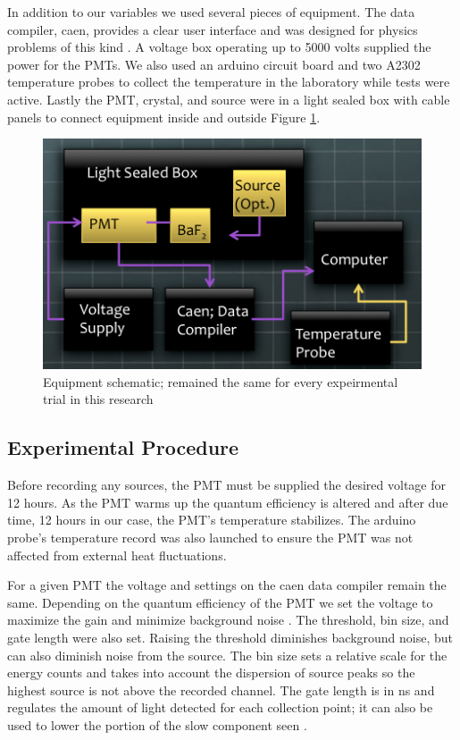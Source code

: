 \documentclass[aip, jmp, amsmath, amssymb, reprint, floatfix]{revtex4-1}
\begin{document}
In addition to our variables we used several pieces of equipment. The data compiler, caen, provides a clear user interface and was designed for physics problems of this kind \cite{caen}. A voltage box operating up to 5000 volts supplied the power for the PMTs. We also used an arduino circuit board and two A2302 temperature probes to collect the temperature in the laboratory while tests were active. Lastly the PMT, crystal, and source were in a light sealed box with cable panels to connect equipment inside and outside Figure \ref{fig:schem}. 

\begin{figure}
  \centering
    \includegraphics[width=.8\columnwidth]{schem.png}
  \caption{Equipment schematic; remained the same for every expeirmental trial in this research}
  \label{fig:schem}
\end{figure} 


\subsection{\label{sec:level2}Experimental Procedure}

Before recording any sources, the PMT must be supplied the desired voltage for 12 hours. As the PMT warms up the quantum efficiency is altered and after due time, 12 hours in our case, the PMT's temperature stabilizes. The arduino probe's temperature record was also launched to ensure the PMT was not affected from external heat fluctuations. 

For a given PMT the voltage and settings on the caen data compiler remain the same. Depending on the quantum efficiency of the PMT we set the voltage to maximize the gain and minimize background noise \cite{PMT}. The threshold, bin size, and gate length were also set. Raising the threshold diminishes background noise, but can also diminish noise from the source. The bin size sets a relative scale for the energy counts and takes into account the dispersion of source peaks so the highest source is not above the recorded channel. The gate length is in ns and regulates the amount of light detected for each collection point; it can also be used to lower the portion of the slow component seen \cite{caen}. 
\end{document}
